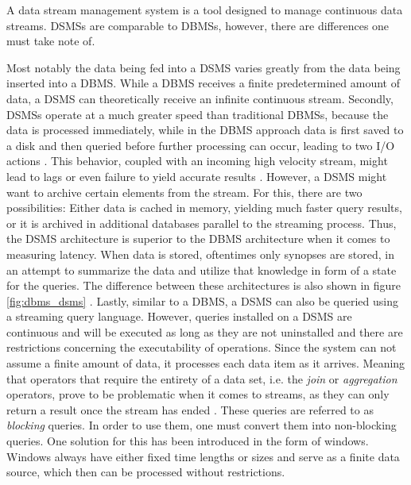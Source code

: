         A data stream management system is a tool designed to manage continuous data streams.
        DSMSs are comparable to DBMSs, however, there are differences one must take note of.

        \quad Most notably the data being fed into a DSMS varies greatly from the data being inserted into a DBMS. While a DBMS receives a finite predetermined amount 
        of data, a DSMS can theoretically receive an infinite continuous stream.
        Secondly, DSMSs operate at a much greater speed than traditional DBMSs, because the data is processed immediately, while in the DBMS approach
        data is first saved to a disk and then queried before further processing can occur, leading to two I/O actions \cite{StreamBookQuality}. This behavior, coupled with an incoming 
        high velocity stream, might lead to lags or even failure to yield accurate results \cite{StreamBookQuality}. 
        However, a DSMS might want to archive certain elements from the stream. For this, there are two possibilities:
        Either data is cached in memory, yielding much faster query results, or it is archived in additional databases parallel to the streaming process.
        Thus, the DSMS architecture is superior to the DBMS architecture when it comes to measuring latency.
        When data is stored, oftentimes only synopses are stored, in an attempt to summarize the data and utilize that knowledge in form of a \gls{state} for the queries.
        The difference between these architectures is also shown in figure \ref{fig:dbms_dsms} \cite{StreamBookQuality}.
        Lastly, similar to a DBMS, a DSMS can also be queried using a streaming query language. However, queries installed on a DSMS are continuous 
        and will be executed as long as they are not uninstalled and there are restrictions concerning the executability of operations.
        Since the system can not assume a finite amount of data, it processes each data item as it arrives. Meaning that operators that require the entirety of a data 
        set, i.e. the \textit{join} or \textit{aggregation} operators, prove to be problematic when it comes to streams, 
        as they can only return a result once the stream has ended \cite[p.12]{StreamBookQuality}.
        These queries are referred to as \textit{blocking} queries. In order to use them, one must convert them into non-blocking queries.
        One solution for this has been introduced in the form of windows.
        Windows always have either fixed time lengths or sizes and serve as a finite data source, which then can be processed without restrictions.


